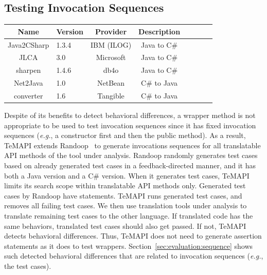 \subsection{Testing Invocation Sequences}
\label{sec:approach:sequence}
\begin{table}[t]
\centering
\begin{SmallOut}
\begin {tabular} {|c|l|c|c|c|c|c|c|}
 \hline
\textbf{Name}& \textbf{Version}& \textbf{Provider} &\textbf{Description}\\
\hline
Java2CSharp  &  1.3.4 & IBM (ILOG) & Java to C\# \\
\hline
JLCA         &  3.0   & Microsoft  & Java to C\# \\
\hline
sharpen      &  1.4.6 & db4o       & Java to C\# \\
\hline
Net2Java     &  1.0   & NetBean    &  C\# to Java\\
\hline
converter    &  1.6   & Tangible   &  C\# to Java\\
\hline
\end{tabular}\vspace*{-2ex}
 \label{table:subjects}
\end{SmallOut}\vspace*{-4ex}
\end{table}
Despite of its benefits to detect behavioral differences, a wrapper method is not appropriate to be used to test invocation sequences since it has fixed invocation sequences (\emph{e.g.}, a constructor first and then the public method). As a result, TeMAPI extends Randoop~\cite{pacheco2007feedback} to generate invocations sequences for all translatable API methods of the tool under analysis. Randoop randomly generates test cases based on already generated test cases in a feedback-directed manner, and it has both a Java version and a C\# version. When it generates test cases, TeMAPI limits its search scope within translatable API methods only. Generated test cases by Randoop have  statements. TeMAPI runs generated test cases, and removes all failing test cases. We then use translation tools under analysis to translate remaining test cases to the other language. If translated code has the same behaviors, translated test cases should also get passed. If not, TeMAPI detects behavioral differences. Thus, TeMAPI does not need to generate assertion statements as it does to test wrappers. Section~\ref{sec:evaluation:sequence} shows such detected behavioral differences that are related to invocation sequences (\emph{e.g.}, the  test cases).




